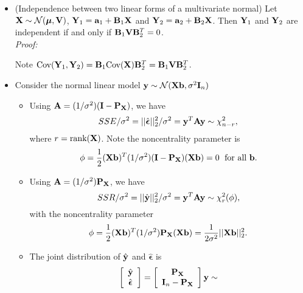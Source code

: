\begin{itemize}
	\item (Independence between two linear forms of a multivariate normal)  Let $\mathbf{X}\sim \mathcal{N}(\boldsymbol{\mu}, \mathbf{V})$, $\mathbf{Y}_1 = \mathbf{a}_1 + \mathbf{B}_1 \mathbf{X}$ and $\mathbf{Y}_2 = \mathbf{a}_2 + \mathbf{B}_2 \mathbf{X}$.  Then $\mathbf{Y}_1$ and $\mathbf{Y}_2$ are independent if and only if $\mathbf{B}_1 \mathbf{V}\mathbf{B}_2^T = 0$.\\
{\it Proof:}
\begin{pf}
	Note $\mbox{Cov}(\mathbf{Y}_1, \mathbf{Y}_2) = \mathbf{B}_1 \mbox{Cov}(\mathbf{X})\mathbf{B}_2^T = \mathbf{B}_1 \mathbf{V}\mathbf{B}_2^T$.
\end{pf}
    \item Consider the normal linear model $\mathbf{y} \sim \mathcal{N}(\mathbf{Xb}, \sigma^2 \mathbf{I}_n)$
        \begin{itemize}
        	\item Using $\mathbf{A} = (1/ \sigma^2)(\mathbf{I} - \mathbf{P}_{\mathbf{X}})$, we have
        	$$
        	SSE/\sigma^2 = ||\hat{\boldsymbol{\epsilon}}||_2^2/\sigma^2 = \mathbf{y}^T\mathbf{Ay} \sim \chi^2_{n - r},
        	$$
        	where $r = \mbox{rank}(\mathbf{X})$.  Note the noncentrality parameter is
        	$$
        	\phi = \frac{1}{2}(\mathbf{Xb})^T(1 / \sigma^2)(\mathbf{I} - \mathbf{P}_{\mathbf{X}})(\mathbf{Xb}) = 0\; \mbox{ for all } \mathbf{b}.
        	$$
        	\item Using $\mathbf{A} = (1 / \sigma^2)\mathbf{P}_{\mathbf{X}}$, we have
        	$$
        	SSR/\sigma^2 = ||\hat{\mathbf{y}}||_2^2/\sigma^2 = \mathbf{y}^T\mathbf{Ay} \sim \chi^2_{r}(\phi),
        	$$
        	with the noncentrality parameter
        	$$
        	\phi = \frac{1}{2}(\mathbf{Xb})^T(1 / \sigma^2) \mathbf{P}_{\mathbf{X}}(\mathbf{Xb}) = \frac{ 1}{2 \sigma^2}||\mathbf{Xb}||_2^2.
        	$$
        	\item The joint distribution of $\hat{\mathbf{y}}$ and $\hat{\boldsymbol{\epsilon}}$ is
        	$$
        	\left[
        	\begin{array}{c}
        		\hat{\mathbf{y}}\\
        		\hat{\boldsymbol{\epsilon}}\\
        	\end{array} \right] = \left[\begin{array}{c}
        	\mathbf{P}_{\mathbf{X}}\\
        	\mathbf{I}_n - \mathbf{P}_{\mathbf{X}}\\
        \end{array}\right]\mathbf{y} \sim
$$
\end{itemize}
\end{itemize}
